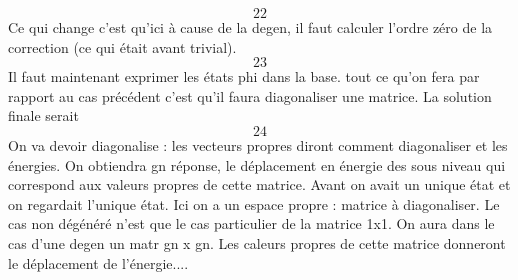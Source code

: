 	\begin{equation}
	22
	\end{equation}
	Ce qui change c'est qu'ici à cause de la degen, il faut calculer l'ordre
	zéro de la correction (ce qui était avant trivial). 
	\begin{equation}
	23
	\end{equation}		
	Il faut maintenant exprimer les états phi dans la base. tout ce qu'on 
	fera par rapport au cas précédent c'est qu'il faura diagonaliser une 
	matrice. La solution finale serait
	\begin{equation}
	24
	\end{equation}
	On va devoir diagonalise : les vecteurs propres diront comment 
	diagonaliser et les énergies. On obtiendra gn réponse, le déplacement en 
	énergie des sous niveau qui correspond aux valeurs propres de cette 
	matrice. Avant on avait un unique état et on regardait l'unique état. Ici 
	on a un espace propre : matrice à diagonaliser. Le cas non dégénéré n'est 
	que le cas particulier de la matrice 1x1. On aura dans le cas d'une 
	degen un matr gn x gn. Les caleurs propres de cette matrice donneront le 
	déplacement de l'énergie....